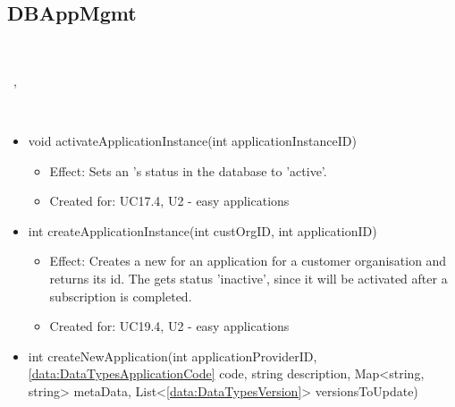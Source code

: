   \subsection{DBAppMgmt}\label{int:OtherDataDatabaseOtherDataDBDBAppMgmt}
    \begin{description}
      \item[Provided by:] \iconcomponent{}~
      \item[Required by:] \iconcomponent{}~, \iconcomponent{}~
      \item[Operations:] ~
    \begin{itemize}[noitemsep,nolistsep,leftmargin=-.25cm]
      \item \textsf{void activateApplicationInstance(int applicationInstanceID)}
        \begin{itemize}[noitemsep,nolistsep]
           \item Effect: Sets an 's status in the database to 'active'.
\item Created for: UC17.4, U2 - easy applications
        \end{itemize}
      \item \textsf{int createApplicationInstance(int custOrgID, int applicationID)}
        \begin{itemize}[noitemsep,nolistsep]
           \item Effect: Creates a new  for an application for a customer organisation and returns its id. The  gets status 'inactive', since it will be activated after a subscription is completed.
\item Created for: UC19.4, U2 - easy applications
        \end{itemize}
      \item \textsf{int createNewApplication(int applicationProviderID, \ref{data:DataTypesApplicationCode} code, string description, Map\textless{}string, string\textgreater{} metaData, List\textless{}\ref{data:DataTypesVersion}\textgreater{} versionsToUpdate)}
        \begin{itemize}

\end{itemize}
\end{itemize}
\end{description}

